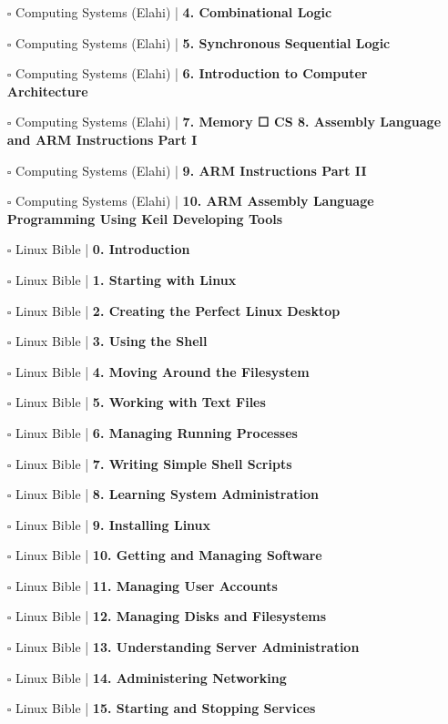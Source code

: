 \documentclass[a4, landscape, 12pt]{article}
\newcommand{\checkbox}{$\square$}%
\begin{document}
\begin{itemize}
{}
\item [\checkbox]  Computing Systems (Elahi)  | \textbf{ 4. Combinational Logic
}
\item [\checkbox]  Computing Systems (Elahi)  | \textbf{ 5. Synchronous Sequential Logic
}
\item [\checkbox]  Computing Systems (Elahi)  | \textbf{ 6. Introduction to Computer Architecture
}
\item [\checkbox]  Computing Systems (Elahi)  | \textbf{ 7. Memory ☐ CS 8. Assembly Language and ARM Instructions Part I
}
\item [\checkbox]  Computing Systems (Elahi)  | \textbf{ 9. ARM Instructions Part II
}
\item [\checkbox]  Computing Systems (Elahi)  | \textbf{ 10. ARM Assembly Language Programming Using Keil Developing Tools
}
\item [\checkbox]  Linux Bible | \textbf{ 0. Introduction
}
\item [\checkbox]  Linux Bible | \textbf{ 1. Starting with Linux
}
\item [\checkbox]  Linux Bible | \textbf{ 2. Creating the Perfect Linux Desktop
}
\item [\checkbox]  Linux Bible | \textbf{ 3. Using the Shell
}
\item [\checkbox]  Linux Bible | \textbf{ 4. Moving Around the Filesystem
}
\item [\checkbox]  Linux Bible | \textbf{ 5. Working with Text Files
}
\item [\checkbox]  Linux Bible | \textbf{ 6. Managing Running Processes
}
\item [\checkbox]  Linux Bible | \textbf{ 7. Writing Simple Shell Scripts
}
\item [\checkbox]  Linux Bible | \textbf{ 8. Learning System Administration
}
\item [\checkbox]  Linux Bible | \textbf{ 9. Installing Linux
}
\item [\checkbox]  Linux Bible | \textbf{ 10. Getting and Managing Software
}
\item [\checkbox]  Linux Bible | \textbf{ 11. Managing User Accounts
}
\item [\checkbox]  Linux Bible | \textbf{ 12. Managing Disks and Filesystems
}
\item [\checkbox]  Linux Bible | \textbf{ 13. Understanding Server Administration
}
\item [\checkbox]  Linux Bible | \textbf{ 14. Administering Networking
}
\item [\checkbox]  Linux Bible | \textbf{ 15. Starting and Stopping Services
}
\end{itemize}
\end{document}
